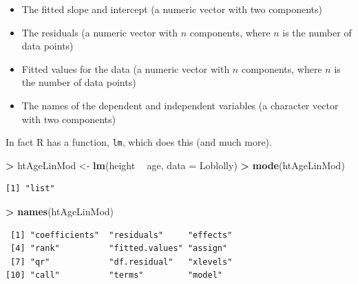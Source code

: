 \documentclass[]{krantz}
\makeatletter
\newenvironment{Shaded}{\begin{snugshade}}{\end{snugshade}}
\newcommand{\DataTypeTok}[1]{\textcolor[rgb]{0.27,0.27,0.27}{#1}}
\newcommand{\KeywordTok}[1]{\textcolor[rgb]{0.27,0.27,0.27}{\textbf{#1}}}
\newcommand{\NormalTok}[1]{#1}
\newcommand{\OperatorTok}[1]{\textcolor[rgb]{0.43,0.43,0.43}{\textbf{#1}}}
\newcommand{\StringTok}[1]{\textcolor[rgb]{0.5,0.5,0.5}{#1}}
\providecommand{\tightlist}{%
  \setlength{\itemsep}{0pt}\setlength{\parskip}{0pt}}
\newenvironment{kframe}{%
\medskip{}
\setlength{\fboxsep}{.8em}
 \def\at@end@of@kframe{}%
 \ifinner\ifhmode%
  \def\at@end@of@kframe{\end{minipage}}%
  \begin{minipage}{\columnwidth}%
 \fi\fi%
 \def\FrameCommand##1{\hskip\@totalleftmargin \hskip-\fboxsep
 \colorbox{shadecolor}{##1}\hskip-\fboxsep
     \hskip-\linewidth \hskip-\@totalleftmargin \hskip\columnwidth}%
 \MakeFramed {\advance\hsize-\width
   \@totalleftmargin\z@ \linewidth\hsize
   \@setminipage}}%
 {\par\unskip\endMakeFramed%
 \at@end@of@kframe}
\renewenvironment{Shaded}{\begin{kframe}}{\end{kframe}}
\makeatother
\begin{document}
\begin{itemize}
\tightlist
\item
  The fitted slope and intercept (a numeric vector with two components)
\item
  The residuals (a numeric vector with \(n\) components, where \(n\) is the number of data points)
\item
  Fitted values for the data (a numeric vector with \(n\) components, where \(n\) is the number of data points)
\item
  The names of the dependent and independent variables (a character vector with two components)
\end{itemize}

In fact R has a function, \texttt{lm}, which does this (and much more).

\begin{Shaded}
\begin{Highlighting}[]
\OperatorTok{>}\StringTok{ }\NormalTok{htAgeLinMod <-}\StringTok{ }\KeywordTok{lm}\NormalTok{(height }\OperatorTok{~}\StringTok{ }\NormalTok{age, }\DataTypeTok{data =}\NormalTok{ Loblolly)}
\OperatorTok{>}\StringTok{ }\KeywordTok{mode}\NormalTok{(htAgeLinMod)}
\end{Highlighting}
\end{Shaded}

\begin{verbatim}
[1] "list"
\end{verbatim}

\begin{Shaded}
\begin{Highlighting}[]
\OperatorTok{>}\StringTok{ }\KeywordTok{names}\NormalTok{(htAgeLinMod)}
\end{Highlighting}
\end{Shaded}

\begin{verbatim}
 [1] "coefficients"  "residuals"     "effects"      
 [4] "rank"          "fitted.values" "assign"       
 [7] "qr"            "df.residual"   "xlevels"      
[10] "call"          "terms"         "model"        
\end{verbatim}

\begin{Shaded}
\end{Shaded}
\end{document}
